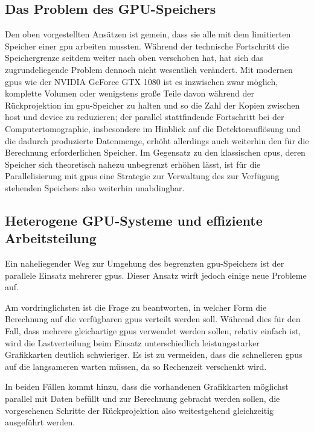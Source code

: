 \subsection{Das Problem des GPU-Speichers}

Den oben vorgestellten Ansätzen ist gemein, dass sie alle mit dem limitierten Speicher einer \gls{gpu} arbeiten mussten.
Während der technische Fortschritt die Speichergrenze seitdem weiter nach oben verschoben hat, hat sich das
zugrundeliegende Problem dennoch nicht wesentlich verändert. Mit modernen \gls{gpu}s wie der NVIDIA{\textregistered}
GeForce{\textregistered} GTX 1080 ist es inzwischen zwar möglich, komplette Volumen oder wenigstens große Teile
davon während der Rückprojektion im \gls{gpu}-Speicher zu halten und so die Zahl der Kopien zwischen \gls{host} und
\gls{device} zu reduzieren; der parallel stattfindende Fortschritt bei der Computertomographie, insbesondere im
Hinblick auf die Detektorauflösung und die dadurch produzierte Datenmenge, erhöht allerdings auch weiterhin den für die
Berechnung erforderlichen Speicher. Im Gegensatz zu den klassischen \gls{cpu}s, deren Speicher sich theoretisch nahezu
unbegrenzt erhöhen lässt, ist für die Parallelisierung mit \gls{gpu}s eine Strategie zur Verwaltung des zur Verfügung
stehenden Speichers also weiterhin unabdingbar.

\subsection{Heterogene GPU-Systeme und effiziente Arbeitsteilung}

Ein naheliegender Weg zur Umgehung des begrenzten \gls{gpu}-Speichers ist der parallele Einsatz mehrerer \gls{gpu}s.
Dieser Ansatz wirft jedoch einige neue Probleme auf.

Am vordringlichsten ist die Frage zu beantworten, in welcher
Form die Berechnung auf die verfügbaren \gls{gpu}s verteilt werden soll. Während dies für den Fall, dass mehrere
gleichartige \gls{gpu}s verwendet werden sollen, relativ einfach ist, wird die Lastverteilung beim Einsatz
unterschiedlich leistungsstarker Grafikkarten deutlich schwieriger. Es ist zu vermeiden, dass die schnelleren \gls{gpu}s
auf die langsameren warten müssen, da so Rechenzeit verschenkt wird.

In beiden Fällen kommt hinzu, dass die vorhandenen Grafikkarten möglichst parallel mit Daten befüllt und zur Berechnung
gebracht werden sollen, die vorgesehenen Schritte der Rückprojektion also weitestgehend gleichzeitig ausgeführt werden.

